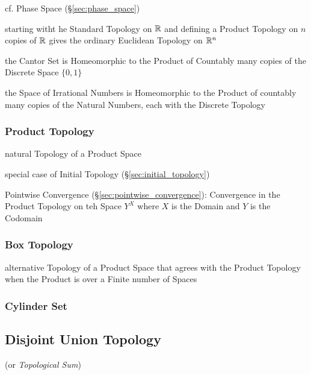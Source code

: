 cf. Phase Space (\S\ref{sec:phase_space})

starting witht he Standard Topology on $\mathbb{R}$ and defining a Product Topology
on $n$ copies of $\mathbb{R}$ gives the ordinary Euclidean Topology on $\mathbb{R}^n$

the Cantor Set is Homeomorphic to the Product of Countably many copies of the
Discrete Space $\{0,1\}$

the Space of Irrational Numbers is Homeomorphic to the Product of countably many
copies of the Natural Numbers, each with the Discrete Topology



\subsubsection{Product Topology}\label{sec:product_topology}

natural Topology of a Product Space

special case of Initial Topology (\S\ref{sec:initial_topology})

Pointwise Convergence (\S\ref{sec:pointwise_convergence}): Convergence in the
Product Topology on teh Space $Y^X$ where $X$ is the Domain and $Y$ is the
Codomain



\subsubsection{Box Topology}\label{sec:box_topology}

alternative Topology of a Product Space that agrees with the Product Topology
when the Product is over a Finite number of Spaces



\subsubsection{Cylinder Set}\label{sec:cylinder_set}



\subsection{Disjoint Union Topology}\label{sec:disjoint_union_topology}

(or \emph{Topological Sum})

